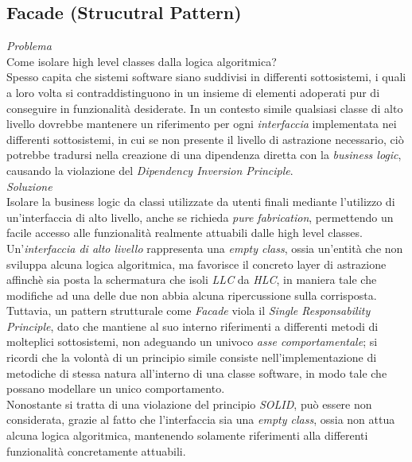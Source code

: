 \documentclass{article}
\begin{document}
\subsection*{Facade (Strucutral Pattern)}
\large
\textit{Problema}\\
Come isolare high level classes dalla logica algoritmica?\vspace*{14pt}\\
Spesso capita che sistemi software siano suddivisi in differenti sottosistemi, i quali a loro volta si contraddistinguono in un insieme di elementi adoperati pur di conseguire in funzionalità desiderate. In un contesto simile qualsiasi classe di alto livello dovrebbe mantenere un riferimento per ogni \textit{interfaccia} implementata nei differenti sottosistemi, in cui se non presente il livello di astrazione necessario, ciò potrebbe tradursi nella creazione di una dipendenza diretta con la \textit{business logic}, causando la violazione del \textit{Dipendency Inversion Principle}.\vspace*{14pt}\\
\textit{Soluzione}\\
Isolare la business logic da classi utilizzate da utenti finali mediante l'utilizzo di un'interfaccia di alto livello, anche se richieda \textit{pure fabrication}, permettendo un facile accesso alle funzionalità realmente attuabili dalle high level classes.\vspace*{14pt}\\
Un'\textit{interfaccia di alto livello} rappresenta una \textit{empty class}, ossia un'entità che non sviluppa alcuna logica algoritmica, ma favorisce il concreto layer di astrazione affinchè sia posta la schermatura che isoli \textit{LLC} da \textit{HLC}, in maniera tale che modifiche ad una delle due non abbia alcuna ripercussione sulla corrisposta.\vspace*{7pt}\\
Tuttavia, un pattern strutturale come \textit{Facade} viola il \textit{Single Responsability Principle}, dato che mantiene al suo interno riferimenti a differenti metodi di molteplici sottosistemi, non adeguando un univoco \textit{asse comportamentale}; si ricordi che la volontà di un principio simile consiste nell'implementazione di metodiche di stessa natura all'interno di una classe software, in modo tale che possano modellare un unico comportamento.\vspace*{7pt}\\
Nonostante si tratta di una violazione del principio \textit{SOLID}, può essere non considerata, grazie al fatto che l'interfaccia sia una \textit{empty class}, ossia non attua alcuna logica algoritmica, mantenendo solamente riferimenti alla differenti funzionalità concretamente attuabili.
\end{document}
